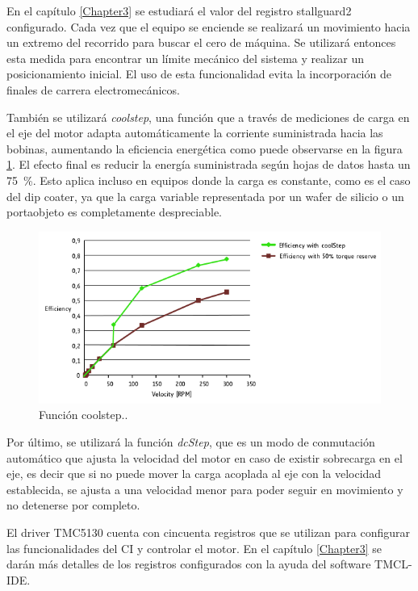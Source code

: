 En el capítulo \ref{Chapter3} se estudiará el valor del registro  stallguard2 configurado. Cada vez que el equipo se enciende se realizará un movimiento hacia un extremo del recorrido para buscar el cero de máquina. Se utilizará entonces esta medida para encontrar un límite mecánico del sistema y realizar  un posicionamiento inicial. El uso de esta funcionalidad evita la incorporación de finales de carrera electromecánicos.   


También se utilizará \textit{coolstep}, una función que a través de mediciones de carga en el eje del motor adapta automáticamente la corriente suministrada hacia las bobinas, aumentando la eficiencia energética como puede observarse en la figura \ref{fig:tmc5130_coolStep}. El efecto final es reducir la energía suministrada según hojas de datos \citep{3_web_trinamic_producto} hasta un \SI{75}{\percent}. Esto aplica incluso en equipos donde la carga es constante, como es el caso del dip coater, ya que la carga variable representada por un wafer de silicio o un portaobjeto es completamente despreciable.

\begin{figure}[h]
\centering 
\includegraphics[width=1\textwidth]{./Figures/tmc5130_coolstep.png}
\caption{Función coolstep.\protect\footnotemark.}
\label{fig:tmc5130_coolStep}
\end{figure}

Por último, se utilizará la función \textit{dcStep}, que es un modo de conmutación automático que ajusta la velocidad del motor en caso de existir sobrecarga en el eje, es decir que si no puede mover la carga acoplada al eje con la velocidad establecida, se ajusta a una velocidad menor para poder seguir en movimiento y no detenerse por completo. 


El driver TMC5130 cuenta con cincuenta registros que se utilizan para configurar las funcionalidades del CI y controlar el motor. En el capítulo \ref{Chapter3} se darán más detalles de los registros configurados con la ayuda del software TMCL-IDE.  


